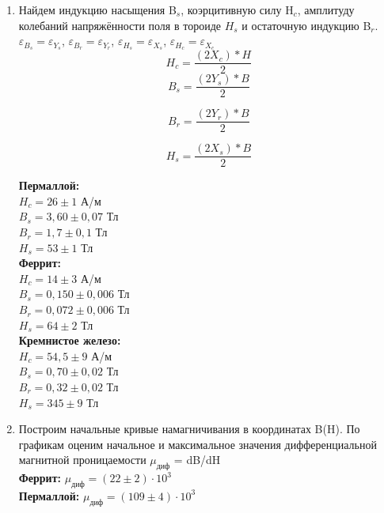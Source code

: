 \documentclass[a4paper, 12pt]{article}%
\begin{document}
\begin{enumerate}
	\item Найдем индукцию насыщения B$_s$, коэрцитивную силу H$_c$, амплитуду колебаний напряжённости поля в тороиде $H_s$ и остаточную индукцию B$_r$.
	$\varepsilon_{B_s} = \varepsilon_{Y_s}$, $\varepsilon_{B_r} = \varepsilon_{Y_r}$, $\varepsilon_{H_s} = \varepsilon_{X_s}$, $\varepsilon_{H_c} = \varepsilon_{X_c}$
	\begin{equation}
		H_c = \frac{(2X_c) * H}{2}
	\end{equation}
	\begin{equation}
		B_s = \frac{(2 Y_s) * B}{2}
	\end{equation}
	
	\begin{equation}
		B_r = \frac{(2 Y_r) * B}{2}
	\end{equation}

	\begin{equation}
		H_s = \frac{(2 X_s) * B}{2}
	\end{equation}
	
	\textbf{Пермаллой: }\\
	$H_c = 26\pm1$ А/м\\
	$B_s = 3,60\pm0,07$ Тл\\
	$B_r = 1,7\pm0,1$ Тл\\
	$H_s = 53\pm1$ Тл\\
	\textbf{Феррит: }\\
	$H_c = 14\pm3$ А/м\\
	$B_s = 0,150\pm0,006$ Тл\\
	$B_r = 0,072\pm0,006$ Тл\\
	$H_s = 64\pm2$ Тл\\
	\textbf{Кремнистое железо: }\\
	$H_c = 54,5\pm9$ А/м\\
	$B_s = 0,70\pm0,02$ Тл\\
	$B_r = 0,32\pm0,02$ Тл\\
	$H_s = 345\pm9$ Тл\\
	
	\item Построим начальные кривые намагничивания в координатах B(H).
	По графикам оценим начальное и максимальное значения дифференциальной магнитной проницаемости $\mu_{\text{диф}}$ = dB/dH\\
	
	\textbf{Феррит: }
	 $\mu_{\text{диф}} = (22 \pm 2) \cdot 10^3$\\
	 
	\textbf{Пермаллой: }
	  $\mu_{\text{диф}} = (109 \pm 4)\cdot 10^3$\\
	  

\end{enumerate}
\end{document}
